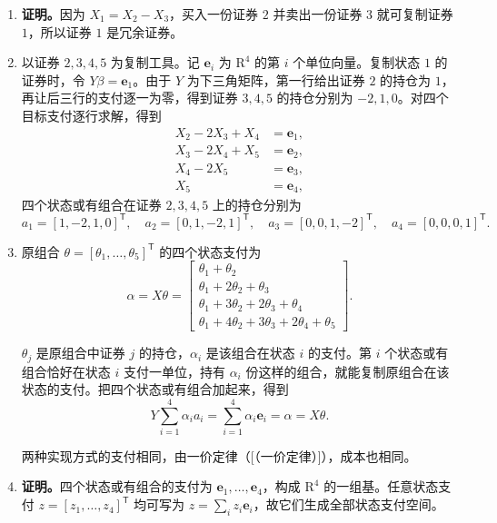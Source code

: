 \begin{solution}[blank-type=manual,blank-vsep=9\baselineskip]
\begin{enumerate}[label=(\alph*),ref=(\alph*)]
    四个状态价格加总为 $1$，与证券 $1$ 的报价一致。因此 $\phi=[1/4,1/4,1/4,1/4]^{\mathsf T}$ 是同时满足五个定价方程的唯一解。四个分量均严格为正，所以这组报价无套利。

    \item\label{prob:wj-four-1-answer-c} \textbf{证明。}因为 $X_1=X_2-X_3$，买入一份证券 $2$ 并卖出一份证券 $3$ 就可复制证券 $1$，所以证券 $1$ 是冗余证券。

    \item\label{prob:wj-four-1-answer-d} 以证券 $2,3,4,5$ 为复制工具。记 $\mathbf e_i$ 为 $\mathrm R^4$ 的第 $i$ 个单位向量。复制状态 $1$ 的证券时，令 $Y\beta=\mathbf e_1$。由于 $Y$ 为下三角矩阵，第一行给出证券 $2$ 的持仓为 $1$，再让后三行的支付逐一为零，得到证券 $3,4,5$ 的持仓分别为 $-2,1,0$。对四个目标支付逐行求解，得到
    \[
      \begin{aligned}
       X_2-2X_3+X_4&=\mathbf e_1,\\
       X_3-2X_4+X_5&=\mathbf e_2,\\
       X_4-2X_5&=\mathbf e_3,\\
       X_5&=\mathbf e_4,
      \end{aligned}
    \]
    四个状态或有组合在证券 $2,3,4,5$ 上的持仓分别为
    \[
      a_1=[1,-2,1,0]^{\mathsf T},\quad a_2=[0,1,-2,1]^{\mathsf T},\quad
      a_3=[0,0,1,-2]^{\mathsf T},\quad a_4=[0,0,0,1]^{\mathsf T}.
    \]

    \item 原组合 $\theta=[\theta_1,\ldots,\theta_5]^{\mathsf T}$ 的四个状态支付为
    \[
      \alpha=X\theta=
      \begin{bmatrix}
       \theta_1+\theta_2\\
       \theta_1+2\theta_2+\theta_3\\
       \theta_1+3\theta_2+2\theta_3+\theta_4\\
       \theta_1+4\theta_2+3\theta_3+2\theta_4+\theta_5
      \end{bmatrix}.
    \]

    $\theta_j$ 是原组合中证券 $j$ 的持仓，$\alpha_i$ 是该组合在状态 $i$ 的支付。第 $i$ 个状态或有组合恰好在状态 $i$ 支付一单位，持有 $\alpha_i$ 份这样的组合，就能复制原组合在该状态的支付。把四个状态或有组合加起来，得到
    \[
      Y\sum_{i=1}^4\alpha_i a_i
      =\sum_{i=1}^4\alpha_i\mathbf e_i=\alpha=X\theta.
    \]

    两种实现方式的支付相同，由一价定律\ifdefined\WJHandoutKnowledge（[（一价定律）]）\fi，成本也相同。

    \item \textbf{证明。}四个状态或有组合的支付为 $\mathbf e_1,\ldots,\mathbf e_4$，构成 $\mathrm R^4$ 的一组基。任意状态支付 $z=[z_1,\ldots,z_4]^{\mathsf T}$ 均可写为 $z=\sum_i z_i\mathbf e_i$，故它们生成全部状态支付空间。
\end{enumerate}
\end{solution}

